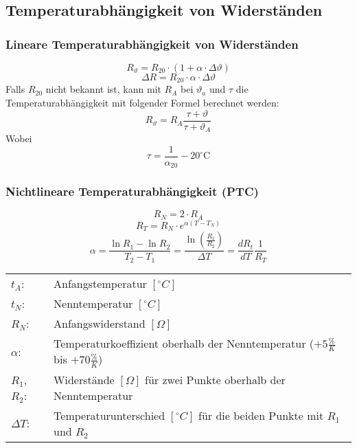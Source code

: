 



\subsection{Temperaturabhängigkeit von Widerständen}

\subsubsection{Lineare Temperaturabhängigkeit von Widerständen}
\[ R_\vartheta = R_{20} \cdot (1 + \alpha \cdot \Delta \vartheta) \]
\[ \Delta R = R_{20} \cdot \alpha \cdot \Delta \vartheta \]
Falls $R_{20}$ nicht bekannt ist, kann mit $R_A$ bei $\vartheta_a$ und $\tau$ 
die Temperaturabhängigkeit mit folgender Formel berechnet werden:  
\[ R_\vartheta = R_A \frac{\tau + \vartheta}{\tau + \vartheta_A} \]
Wobei 
\[ \tau = \frac{1}{\alpha_20} - 20^{\circ}\text{C} \]

\subsubsection{Nichtlineare Temperaturabhängigkeit (PTC)}
\[ R_N = 2 \cdot R_A \]
\[ R_T = R_N \cdot e^{\alpha (T - T_N)} \]
\[ \alpha = \frac{\ln R_1 - \ln R_2}{T_2 - T_1} 
= \frac{\ln\left(\frac{R_1}{R_2}\right)}{\Delta T} 
= \frac{d R_t}{d T}\frac{1}{R_T} \]
\begin{tabular}{@{}lp{}}
  $t_A$:        & Anfangstemperatur $[^\circ C]$ \\
  $t_N$:        & Nenntemperatur $[^\circ C]$ \\
  $R_N$:        & Anfangswiderstand $[\Omega]$ \\
  $\alpha$:     & Temperaturkoeffizient oberhalb der Nenntemperatur 
                  ($+5\frac{\%}{K}$ bis $+70\frac{\%}{K}$) \\
  $R_1$, $R_2$: & Widerstände $[\Omega]$ für zwei Punkte oberhalb der 
                  Nenntemperatur \\
  $\Delta T$:   & Temperaturunterschied $[^\circ C]$ für die beiden Punkte mit 
                  $R_1$ und $R_2$
\end{tabular}

